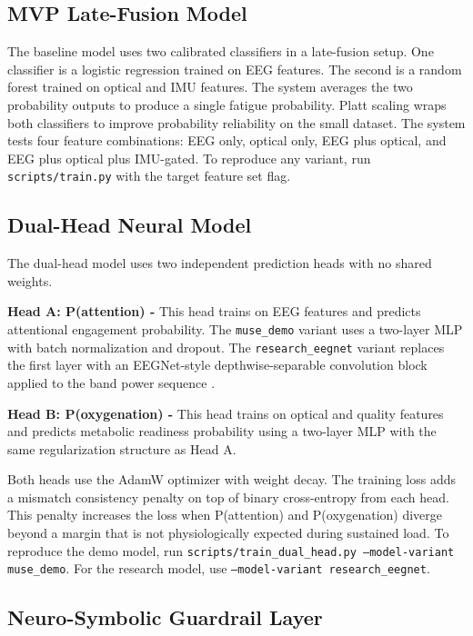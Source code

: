 \documentclass[conference]{IEEEtran}
\begin{document}
\subsection{MVP Late-Fusion Model}

The baseline model uses two calibrated classifiers in a late-fusion setup. One classifier is a logistic regression trained on EEG features. The second is a random forest trained on optical and IMU features. The system averages the two probability outputs to produce a single fatigue probability. Platt scaling wraps both classifiers to improve probability reliability on the small dataset. The system tests four feature combinations: EEG only, optical only, EEG plus optical, and EEG plus optical plus IMU-gated. To reproduce any variant, run \texttt{scripts/train.py} with the target feature set flag.

\subsection{Dual-Head Neural Model}

The dual-head model uses two independent prediction heads with no shared weights.

\textbf{Head A: P(attention) -} This head trains on EEG features and predicts attentional engagement probability. The \texttt{muse\_demo} variant uses a two-layer MLP with batch normalization and dropout. The \texttt{research\_eegnet} variant replaces the first layer with an EEGNet-style depthwise-separable convolution block applied to the band power sequence \cite{b2}.

\textbf{Head B: P(oxygenation) -} This head trains on optical and quality features and predicts metabolic readiness probability using a two-layer MLP with the same regularization structure as Head A.

Both heads use the AdamW optimizer with weight decay. The training loss adds a mismatch consistency penalty on top of binary cross-entropy from each head. This penalty increases the loss when P(attention) and P(oxygenation) diverge beyond a margin that is not physiologically expected during sustained load. To reproduce the demo model, run \texttt{scripts/train\_dual\_head.py --model-variant muse\_demo}. For the research model, use \texttt{--model-variant research\_eegnet}.

\subsection{Neuro-Symbolic Guardrail Layer}
\end{document}
